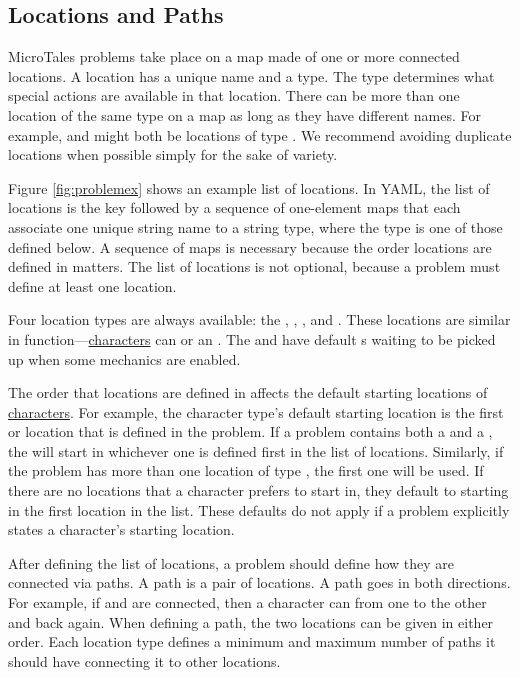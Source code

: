 \documentclass{nilreport}
\begin{document}
\newpage

\subsection{Locations and Paths} \label{sec:locations}

MicroTales problems take place on a map made of one or more connected locations. A location has a unique name and a type. The type determines what special actions are available in that location. There can be more than one location of the same type on a map as long as they have different names. For example,  and  might both be locations of type . We recommend avoiding duplicate locations when possible simply for the sake of variety.

Figure \ref{fig:problemex} shows an example list of locations. In YAML, the list of locations is the key  followed by a sequence of one-element maps that each associate one unique string name to a string type, where the type is one of those defined below. A sequence of maps is necessary because the order locations are defined in matters. The list of locations is not optional, because a problem must define at least one location.

Four location types are always available: the , , , and . These locations are similar in function---\hyperref[sec:characters]{characters} can  or  an . The  and  have default s waiting to be picked up when some mechanics are enabled.

The order that locations are defined in affects the default starting locations of \hyperref[sec:characters]{characters}. For example, the  character type's default starting location is the first  or  location that is defined in the problem. If a problem contains both a  and a , the  will start in whichever one is defined first in the list of locations. Similarly, if the problem has more than one location of type , the first one will be used. If there are no locations that a character prefers to start in, they default to starting in the first location in the list. These defaults do not apply if a problem explicitly states a character's starting location.

After defining the list of locations, a problem should define how they are connected via paths. A path is a pair of locations. A path goes in both directions. For example, if  and  are connected, then a character can  from one to the other and back again. When defining a path, the two locations can be given in either order. Each location type defines a minimum and maximum number of paths it should have connecting it to other locations.
\end{document}
